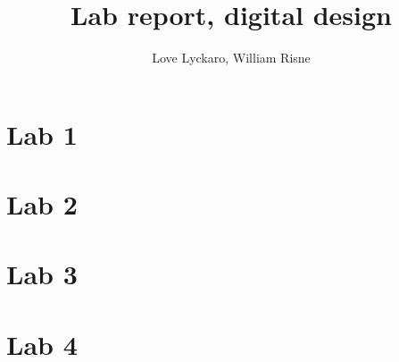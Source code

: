 \documentclass[a4paper]{article}
\title{Lab report, digital design}
\author{Love Lyckaro, William Risne}
\begin{document}
\maketitle

    \section*{Lab 1}
    
    \section*{Lab 2}
    
    \section*{Lab 3}
    
    \section*{Lab 4}
    
\end{document}
